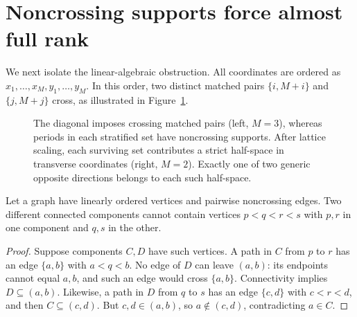 \documentclass[a4paper,USenglish,cleveref,autoref]{lipics-v2021}
\begin{document}
\section{Noncrossing supports force almost full rank}
We next isolate the linear-algebraic obstruction.
All coordinates are ordered as $x_1,\ldots,x_M,y_1,\ldots,y_M$.
In this order, two distinct matched pairs $\{i,M+i\}$ and $\{j,M+j\}$ cross, as illustrated in Figure~\ref{fig:geometry}.

\begin{figure}[t]
\centering
{}
\caption{The diagonal imposes crossing matched pairs (left, $M=3$), whereas periods in each stratified set have noncrossing supports.
After lattice scaling, each surviving set contributes a strict half-space in transverse coordinates (right, $M=2$).
Exactly one of two generic opposite directions belongs to each such half-space.}
\label{fig:geometry}
\end{figure}

\begin{lemma}\label{lem:components}
Let a graph have linearly ordered vertices and pairwise noncrossing edges.
Two different connected components cannot contain vertices $p<q<r<s$ with $p,r$ in one component and $q,s$ in the other.
\end{lemma}
\begin{proof}
Suppose components $C,D$ have such vertices.
A path in $C$ from $p$ to $r$ has an edge $\{a,b\}$ with $a<q<b$.
No edge of $D$ can leave $(a,b)$: its endpoints cannot equal $a,b$, and such an edge would cross $\{a,b\}$.
Connectivity implies $D\subseteq(a,b)$.
Likewise, a path in $D$ from $q$ to $s$ has an edge $\{c,d\}$ with $c<r<d$, and then $C\subseteq(c,d)$.
But $c,d\in(a,b)$, so $a\notin(c,d)$, contradicting $a\in C$.
\end{proof}
\end{document}
